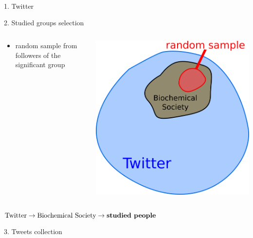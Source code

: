 \documentclass{beamer}
\begin{document}
\begin{frame}[fragile]
\begin{columns}[T]
\begin{column}{.33\textwidth}
\begin{blankblock}{1. Twitter}
\end{blankblock}
\begin{blankblock}{2. Studied groups selection}
    \begin{columns}
        \begin{column}{.5\textwidth}
            \begin{itemize}
                \item random sample from followers of the significant group
            \end{itemize}
        \end{column}
        \begin{column}{.5\textwidth}
            \center
            \includegraphics[scale=0.45]{./Pics/sets.png}
        \end{column}
    \end{columns}
    \center
    $\text{Twitter} \rightarrow \text{Biochemical Society} \rightarrow \text{\textbf{studied people}}$
\end{blankblock}
\begin{blankblock}{3. Tweets collection}
    \begin{columns}
    	\begin{itemize}

\end{itemize}
\end{columns}
\end{blankblock}
\end{column}
\end{columns}
\end{frame}
\end{document}
